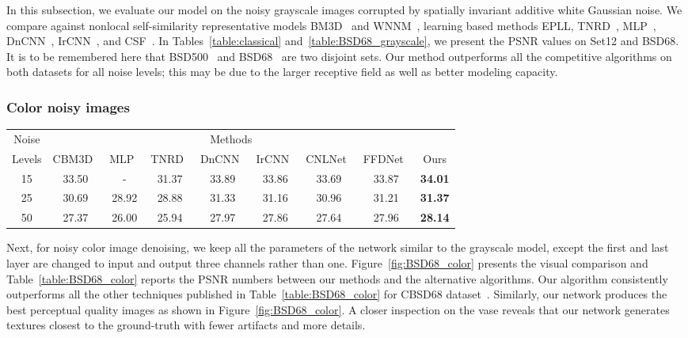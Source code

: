 \documentclass[10pt,twocolumn,letterpaper]{article}
\begin{document}
In this subsection, we evaluate our model on the noisy grayscale images corrupted by spatially invariant additive white Gaussian noise. We compare against nonlocal self-similarity representative models \ie BM3D~\cite{Dabov2007BM3D} and WNNM~\cite{Gu2014WNN}, learning based methods \ie EPLL, TNRD~\cite{chen2017TNRD}, MLP~\cite{Burger2012MLP}, DnCNN~\cite{zhang2017DnCNN}, IrCNN~\cite{zhang2017IRCNN}, and CSF~\cite{schmidt2014CSF}.  In Tables~\ref{table:classical} and~\ref{table:BSD68_grayscale}, we present the PSNR values on Set12 and BSD68. It is to be remembered here that BSD500~\cite{Martin2001BSD} and BSD68~\cite{roth2009fields} are two disjoint sets.  Our method outperforms all the competitive algorithms on both datasets for all noise levels; this may be due to the larger receptive field as well as better modeling capacity.  




\subsubsection{Color noisy images}
\begin{table*}
\centering
\begin{tabular}{c|c|c|c|c|c|c|c|c}
\hline \hline
Noise  & \multicolumn{7}{c}{Methods} \\ 
Levels & CBM3D~\cite{dabov2007CBM3D}       & MLP~\cite{Burger2012MLP}    & TNRD~\cite{chen2017TNRD}  & DnCNN~\cite{zhang2017DnCNN}  & IrCNN~\cite{zhang2017IRCNN}  & CNLNet~\cite{lefkimmiatis2017NLNet} &FFDNet~\cite{zhang2018ffdnet}& Ours   \\ \hline
 15    &  33.50      & -      & 31.37 & 33.89   					& 33.86 & 33.69	&33.87 & \textbf{34.01}\\  
 25    &  30.69      & 28.92  & 28.88 & 31.33   	& 31.16 & 30.96 &31.21 & \textbf{31.37} \\  
 50    &  27.37      & 26.00  & 25.94 & 27.97   					& 27.86 & 27.64	&27.96 & \textbf{28.14}\\ \hline  \hline                
\end{tabular}
\caption{Performance comparison between our network and existing state-of-the-art algorithms on the color version of the BSD68 dataset~\cite{roth2009fields}.}
\label{table:BSD68_color}
\end{table*}
Next, for noisy color image denoising, we keep all the parameters of the network similar to the grayscale model, except the first and last layer are changed to input and output three channels rather than one. Figure~\ref{fig:BSD68_color} presents the visual comparison and Table~\ref{table:BSD68_color} reports the PSNR numbers between our methods and the alternative algorithms. Our algorithm consistently outperforms all the other techniques published in Table~\ref{table:BSD68_color} for CBSD68 dataset~\cite{roth2009fields}.  Similarly, our network produces the best perceptual quality images as shown in Figure~\ref{fig:BSD68_color}. A closer inspection on the vase reveals that our network generates textures closest to the ground-truth with fewer artifacts and more details.
\end{document}
